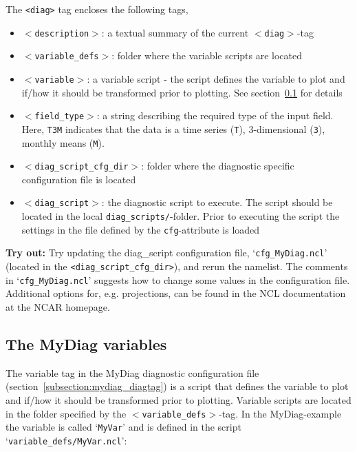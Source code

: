 \documentclass[12pt]{article}
\newcommand{\xmltag}[1]{\texttt{$<$#1$>$}}
\begin{document}
The \texttt{<diag>} tag encloses the following tags,
\begin{itemize}
\item{\xmltag{description}:} a textual summary of the current
\xmltag{diag}-tag

\item{\xmltag{variable\_defs}:} folder where the variable scripts are
located

\item{\xmltag{variable}:} a variable script - the script defines
the variable to plot and if/how it should be transformed prior to
plotting.  See section~\ref{subsection:mydiag_vardef}
for details

\item{\xmltag{field\_type}:} a string describing the required type
of the input field. Here, \texttt{T3M} indicates that the data is a
time series (\texttt{T}), 3-dimensional (\texttt{3}), monthly means
(\texttt{M}).

\item{\xmltag{diag\_script\_cfg\_dir}:} folder where the diagnostic
specific configuration file is located

\item{\xmltag{diag\_script}:} the diagnostic script to execute. The
script should be located in the local \texttt{diag\_scripts/}-folder.
Prior to executing the script the settings in the file defined by the
\texttt{cfg}-attribute is loaded
\end{itemize}

\textbf{Try out:} Try updating the diag\_script configuration file,
`\texttt{cfg\_MyDiag.ncl}' (located in the
\texttt{<diag\_script\_cfg\_dir>}), and rerun the namelist. The comments
in `\texttt{cfg\_MyDiag.ncl}' suggests how to change some values in the
configuration file. Additional options for, e.g. projections, can be
found in the NCL documentation at the NCAR 
homepage\cite{ncar-ncl-homepage}.

\subsection{The MyDiag variables}\label{subsection:mydiag_vardef}
The variable tag in the MyDiag diagnostic configuration file
(section~\ref{subsection:mydiag_diagtag}) is a script that defines the
variable to plot and if/how it should be transformed prior to
plotting. Variable scripts are located in the folder specified by the 
\xmltag{variable\_defs}-tag. In the MyDiag-example the variable is
called `\texttt{MyVar}' and is defined in the script
`\texttt{variable\_defs/MyVar.ncl}':
\end{document}
